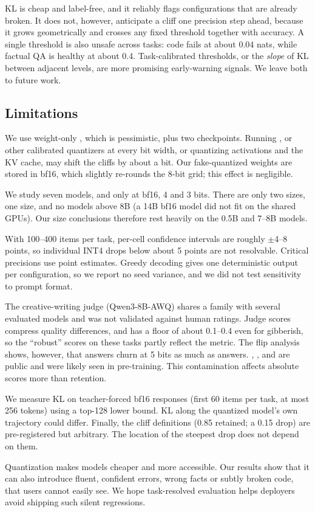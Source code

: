  KL is cheap and label-free, and it reliably flags configurations that are already broken. It does not, however, anticipate a cliff one precision step ahead, because it grows geometrically and crosses any fixed threshold together with accuracy. A single threshold is also unsafe across tasks: code fails at about 0.04 nats, while factual QA is healthy at about 0.4. Task-calibrated thresholds, or the \emph{slope} of KL between adjacent levels, are more promising early-warning signals. We leave both to future work.

\subsection{Limitations}
\label{sec:limitations}

 We use weight-only \rtn, which is pessimistic, plus two \awq checkpoints. Running \gptq, \awq or other calibrated quantizers at every bit width, or quantizing activations and the KV cache, may shift the cliffs by about a bit. Our fake-quantized weights are stored in bf16, which slightly re-rounds the 8-bit grid; this effect is negligible.

 We study seven models, and \phithree only at bf16, 4 and 3 bits. There are only two \llama sizes, one \phithree size, and no models above 8B (a 14B bf16 model did not fit on the shared GPUs). Our size conclusions therefore rest heavily on the 0.5B and 7--8B models.

 With 100--400 items per task, per-cell confidence intervals are roughly $\pm$4--8 points, so individual INT4 drops below about 5 points are not resolvable. Critical precisions use point estimates. Greedy decoding gives one deterministic output per configuration, so we report no seed variance, and we did not test sensitivity to prompt format.

 The creative-writing judge (Qwen3-8B-AWQ) shares a family with several evaluated models and was not validated against human ratings. Judge scores compress quality differences, and \ifeval has a floor of about 0.1--0.4 even for gibberish, so the ``robust'' scores on these tasks partly reflect the metric. The flip analysis shows, however, that \ifeval answers churn at 5 bits as much as \gsm answers. \gsm, \trivia, \squad and \humaneval are public and were likely seen in pre-training. This contamination affects absolute scores more than retention.

 We measure KL on teacher-forced bf16 responses (first 60 items per task, at most 256 tokens) using a top-128 lower bound. KL along the quantized model's own trajectory could differ. Finally, the cliff definitions (0.85 retained; a 0.15 drop) are pre-registered but arbitrary. The location of the steepest drop does not depend on them.

 Quantization makes models cheaper and more accessible. Our results show that it can also introduce fluent, confident errors, \eg wrong facts or subtly broken code, that users cannot easily see. We hope task-resolved evaluation helps deployers avoid shipping such silent regressions.
